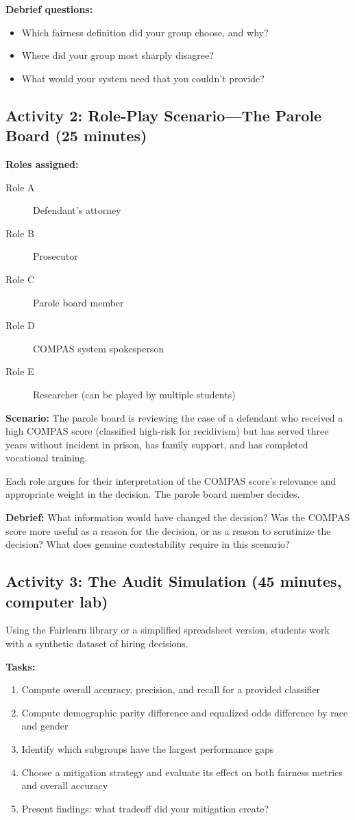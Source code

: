 \textbf{Debrief questions:}
\begin{itemize}
    \item Which fairness definition did your group choose, and why?
    \item Where did your group most sharply disagree?
    \item What would your system need that you couldn't provide?
\end{itemize}

\subsection*{Activity 2: Role-Play Scenario---The Parole Board (25 minutes)}

\textbf{Roles assigned:}
\begin{description}
    \item[Role A] Defendant's attorney
    \item[Role B] Prosecutor
    \item[Role C] Parole board member
    \item[Role D] COMPAS system spokesperson
    \item[Role E] Researcher (can be played by multiple students)
\end{description}

\textbf{Scenario:} The parole board is reviewing the case of a defendant who received a high COMPAS score (classified high-risk for recidivism) but has served three years without incident in prison, has family support, and has completed vocational training.

Each role argues for their interpretation of the COMPAS score's relevance and appropriate weight in the decision. The parole board member decides.

\textbf{Debrief:} What information would have changed the decision? Was the COMPAS score more useful as a reason for the decision, or as a reason to scrutinize the decision? What does genuine contestability require in this scenario?

\subsection*{Activity 3: The Audit Simulation (45 minutes, computer lab)}

Using the Fairlearn library or a simplified spreadsheet version, students work with a synthetic dataset of hiring decisions.

\textbf{Tasks:}
\begin{enumerate}
    \item Compute overall accuracy, precision, and recall for a provided classifier
    \item Compute demographic parity difference and equalized odds difference by race and gender
    \item Identify which subgroups have the largest performance gaps
    \item Choose a mitigation strategy and evaluate its effect on both fairness metrics and overall accuracy
    \item Present findings: what tradeoff did your mitigation create?
\end{enumerate}

